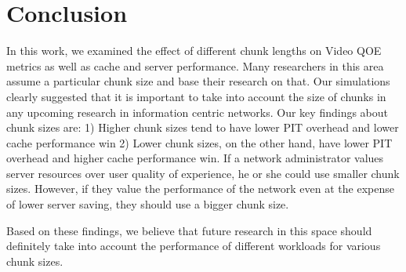 \section{Conclusion} \label{sec:conclusion}

In this work, we examined the effect of different chunk lengths on
Video QOE metrics as well as cache and server performance. Many
researchers in this area assume a particular chunk size and base their
research on that. Our simulations clearly suggested that it is
important to take into account the size of chunks in any upcoming
research in information centric networks. Our key findings about chunk
sizes are: 1) Higher chunk sizes tend to have lower PIT overhead and
lower cache performance win 2) Lower chunk sizes, on the other hand,
have lower PIT overhead and higher cache performance win. If a network
administrator values server resources over user quality of experience,
he or she could use smaller chunk sizes. However, if they value the
performance of the network even at the expense of lower server saving,
they should use a bigger chunk size.

Based on these findings, we believe that future research in this space
should definitely take into account the performance of different
workloads for various chunk sizes.
